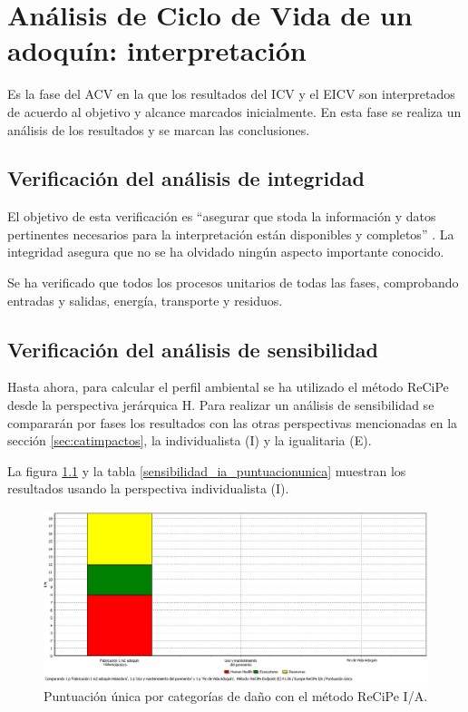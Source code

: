 \chapter{Análisis de Ciclo de Vida de un adoquín: interpretación}\label{cap:acv_interpretacion}

Es la fase del ACV en la que los resultados del ICV y el EICV son interpretados de acuerdo al objetivo y alcance marcados inicialmente. En esta fase se realiza un análisis de los resultados y se marcan las conclusiones.

\section{Verificación del análisis de integridad}

El objetivo de esta verificación es ``asegurar que stoda la información y datos pertinentes necesarios para la interpretación están disponibles y completos'' \cite{iso14044}. La integridad asegura que no se ha olvidado ningún aspecto importante conocido.

Se ha verificado que todos los procesos unitarios de todas las fases, comprobando entradas y salidas, energía, transporte y residuos.

\section{Verificación del análisis de sensibilidad}

Hasta ahora, para calcular el perfil ambiental se ha utilizado el método ReCiPe desde la perspectiva jerárquica H. Para realizar un análisis de sensibilidad se compararán por fases los resultados con las otras perspectivas mencionadas en la sección \ref{sec:catimpactos}, la individualista (I) y la igualitaria (E).

La figura \ref{fig:sensibilidad_ia_puntuacionunica} y la tabla \ref{sensibilidad_ia_puntuacionunica} muestran los resultados usando la perspectiva individualista (I).

\begin{figure}[!htb]
\centering
\includegraphics[width=15cm]{img/sensibilidad_ia_puntuacionunica.png}
\caption{Puntuación única por categorías de daño con el método ReCiPe I/A.}
\label{fig:sensibilidad_ia_puntuacionunica}
\end{figure}

